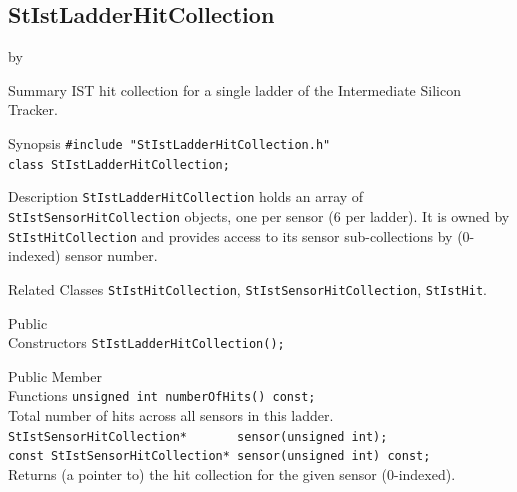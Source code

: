 \documentclass[twoside]{article}
\newcommand{\entrylabel}[1]{\mbox{\textbf{{#1}}}\hfil}%
\newenvironment{entry}
{\begin{list}{}%
    {\renewcommand{\makelabel}{\entrylabel}%
     \setlength{\labelwidth}{90pt}%
     \setlength{\leftmargin}{\labelwidth}
     \advance\leftmargin by \labelsep%
      }%
    }%
  {\end{list}}
\newcommand{\Entrylabel}[1]%
{\raisebox{0pt}[1ex][0pt]{\makebox[\labelwidth][l]%
    {\parbox[t]{\labelwidth}{\hspace{0pt}\textbf{{#1}}}}}}
\newenvironment{Entry}%
{\renewcommand{\entrylabel}{\Entrylabel}\begin{entry}}%
  {\end{entry}}
\begin{document}
\subsection{StIstLadderHitCollection}
\label{sec:StIstLadderHitCollection}
\begin{Entry}
\item[Summary] IST hit collection for a single ladder of the Intermediate
    Silicon Tracker.
\item[Synopsis]
    \verb+#include "StIstLadderHitCollection.h"+\\
    \verb+class StIstLadderHitCollection;+\\
\item[Description]
    \texttt{StIstLadderHitCollection} holds an array of
    \texttt{StIstSensorHitCollection} objects, one per sensor (6 per ladder).
    It is owned by \texttt{StIstHitCollection} and provides access to its
    sensor sub-collections by (0-indexed) sensor number.
\item[Related Classes]
    \texttt{StIstHitCollection}, \texttt{StIstSensorHitCollection},
    \texttt{StIstHit}.
\item[Public\\ Constructors]
    \verb+StIstLadderHitCollection();+\\
\item[Public Member\\ Functions]
    \verb+unsigned int numberOfHits() const;+\\
    Total number of hits across all sensors in this ladder.\\
    \verb+StIstSensorHitCollection*       sensor(unsigned int);+\\
    \verb+const StIstSensorHitCollection* sensor(unsigned int) const;+\\
    Returns (a pointer to) the hit collection for the given sensor (0-indexed).\\
\end{Entry}
\clearpage

\end{document}
